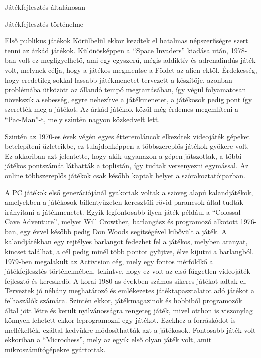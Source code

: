\begin{MyChapter}{Játékfejlesztés általánosan}
\begin{MySection}{Játékfejlesztés történelme}
\begin{MySubSection}{Első publikus játékok}
			Körülbelül ekkor kezdtek el hatalmas népszerűségre szert tenni az árkád játékok. Különösképpen a ``Space Invaders'' kiadása után, 1978-ban volt ez megfigyelhető, ami egy egyszerű, mégis addiktív és adrenalindús játék volt, melynek célja, hogy a játékos megmentse a Földet az alien-ektől. Érdekesség, hogy eredetileg sokkal lassabb játékmenetet tervezett a készítője, azonban problémába ütközött az állandó tempó megtartásában, így végül folyamatosan növekszik a sebesség, egyre nehezítve a játékmenetet, a játékosok pedig pont így szerették meg a játékot. Az árkád játékok közül még érdemes megemlíteni a ``Pac-Man''-t, mely szintén nagyon közkedvelt lett.
			\cite{arcade}
						
			Szintén az 1970-es évek végén egyes étteremláncok elkezdtek videojáték gépeket betelepíteni üzleteikbe, ez tulajdonképpen a többszereplős játékok gyökere volt. Ez akkoriban azt jelentette, hogy akik ugyanazon a gépen játszottak, a többi játékos pontszámát láthatták a toplistán, így tudtak versenyezni egymással. Az online többszereplős játékok csak később kaptak helyet a szórakoztatóiparban.
			
			A PC játékok első generációjánál gyakoriak voltak a szöveg alapú kalandjátékok, amelyekben a játékosok billentyűzeten keresztüli rövid parancsok által tudták irányítani a játékmenetet. Egyik legfontosabb ilyen játék például a ``Colossal Cave Adventure'', melyet Will Crowther, barlangász és programozó alkotott 1976-ban, egy évvel később pedig Don Woods segítségével kibővült a játék. A kalandjátékban egy rejtélyes barlangot fedezhet fel a játékos, melyben aranyat, kincset találhat, a cél pedig minél több pontot gyűjtve, élve kijutni a barlangból.
			\cite{colossal_cave_adventure}
			1979-ben megalakult az Activision cég, mely egy fontos mérföldkő a játékfejlesztés történelmében, tekintve, hogy ez volt az első független videojáték fejlesztő és kereskedő. A korai 1980-as években számos sikeres játékot adtak el. Terveztek jó néhány meghatározó és emlékezetes játéktapasztalatot adó játékot a felhaszálók számára.
			\cite{activision_aboutus}
			Szintén ekkor, játékmagazinok és hobbiból programozók által jött létre és került nyilvánosságra rengeteg játék, mivel otthon is viszonylag könnyen lehetett ekkor leprogramozni egy játékot. Ezekhez a forráskódot is mellékelték, ezáltal kedvükre módosíthatták azt a játékosok. Fontosabb játék volt ekkoriban a ``Microchess'', mely az egyik első olyan játék volt, amit mikroszámítógépekre gyártottak.
		\end{MySubSection}
		

\end{MySection}
\end{MyChapter}
